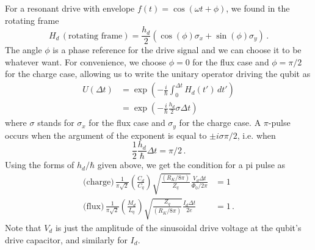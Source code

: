 For a resonant drive with envelope $f(t) = \cos(\omega t + \phi)$, we found in the rotating frame
\begin{equation*}
  H_d \, (\text{rotating frame}) = \frac{h_d}{2} \left( \cos(\phi) \sigma_x + \sin(\phi) \sigma_y \right) \, .
\end{equation*}
The angle $\phi$ is a phase reference for the drive signal and we can choose it to be whatever want.
For convenience, we choose $\phi=0$ for the flux case and $\phi=\pi/2$ for the charge case, allowing us to write the unitary operator driving the qubit as
\begin{align*}
  U(\Delta t)
  &= \exp \left( -\frac{i}{\hbar} \int_0^{\Delta t} H_d(t') \, dt' \right) \\
  &= \exp \left( -\frac{i}{\hbar} \frac{h_d}{2} \sigma \Delta t \right)
\end{align*}
where $\sigma$ stands for $\sigma_x$ for the flux case and $\sigma_y$ for the charge case.
A $\pi$-pulse occurs when the argument of the exponent is equal to $\pm i \sigma \pi / 2$, i.e. when
\begin{equation*}
  \frac{1}{2} \frac{h_d}{\hbar} \Delta t = \pi / 2 \, .
\end{equation*}
Using the forms of $h_d/\hbar$ given above, we get the condition for a pi pulse as
\begin{align*}
  \text{(charge)} \, \frac{1}{\pi\sqrt{2}} \left( \frac{C_d}{C_q} \right) \sqrt{\frac{(R_K/8\pi)}{Z_q}} \frac{V_d \Delta t}{\Phi_0/2\pi} &= 1 \\
  \text{(flux)} \, \frac{1}{\pi\sqrt{2}} \left( \frac{M_d}{L_q} \right) \sqrt{\frac{Z_q}{(R_K/8\pi)}} \frac{I_d \Delta t}{2e} &= 1 \, .
\end{align*}
Note that $V_d$ is just the amplitude of the sinusoidal drive voltage at the qubit's drive capacitor, and similarly for $I_d$.


